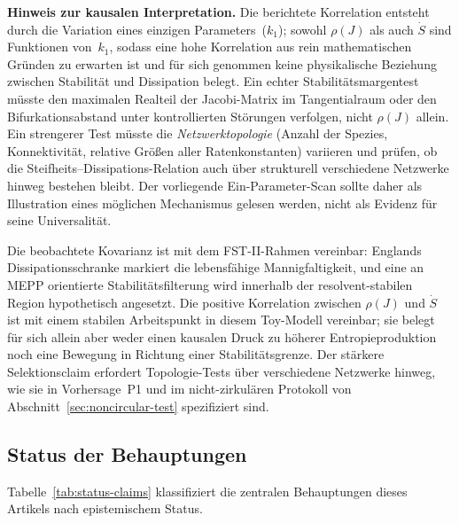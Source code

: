 \documentclass[12pt,a4paper]{article}
\theoremstyle{remark}
\begin{document}
\textbf{Hinweis zur kausalen Interpretation.} Die berichtete Korrelation entsteht durch die Variation eines einzigen Parameters~($k_1$); sowohl $\rho(J)$ als auch $\dot{S}$ sind Funktionen von~$k_1$, sodass eine hohe Korrelation aus rein mathematischen Gründen zu erwarten ist und für sich genommen keine physikalische Beziehung zwischen Stabilität und Dissipation belegt. Ein echter Stabilitätsmargentest müsste den maximalen Realteil der Jacobi-Matrix im Tangentialraum oder den Bifurkationsabstand unter kontrollierten Störungen verfolgen, nicht $\rho(J)$ allein. Ein strengerer Test müsste die \emph{Netzwerktopologie} (Anzahl der Spezies, Konnektivität, relative Größen aller Ratenkonstanten) variieren und prüfen, ob die Steifheits--Dissipations-Relation auch über strukturell verschiedene Netzwerke hinweg bestehen bleibt. Der vorliegende Ein-Parameter-Scan sollte daher als Illustration eines möglichen Mechanismus gelesen werden, nicht als Evidenz für seine Universalität.

Die beobachtete Kovarianz ist mit dem FST-II-Rahmen vereinbar: Englands Dissipationsschranke markiert die lebensfähige Mannigfaltigkeit, und eine an MEPP orientierte Stabilitätsfilterung wird innerhalb der resolvent-stabilen Region hypothetisch angesetzt. Die positive Korrelation zwischen $\rho(J)$ und $\dot{S}$ ist mit einem stabilen Arbeitspunkt in diesem Toy-Modell vereinbar; sie belegt für sich allein aber weder einen kausalen Druck zu höherer Entropieproduktion noch eine Bewegung in Richtung einer Stabilitätsgrenze. Der stärkere Selektionsclaim erfordert Topologie-Tests über verschiedene Netzwerke hinweg, wie sie in Vorhersage~P1 und im nicht-zirkulären Protokoll von Abschnitt~\ref{sec:noncircular-test} spezifiziert sind.

\subsection{Status der Behauptungen}

Tabelle~\ref{tab:status-claims} klassifiziert die zentralen Behauptungen dieses Artikels nach epistemischem Status.
\end{document}

